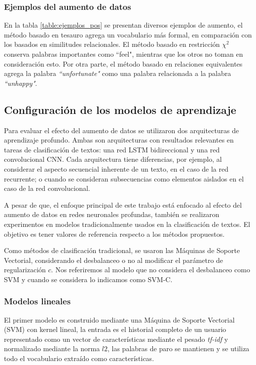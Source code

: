 

\subsubsection{Ejemplos del aumento de datos}
En la tabla \ref{table:ejemplos_pos} se presentan diversos ejemplos de aumento, el método basado en tesauro agrega un vocabulario más formal, en comparación con los basados en similitudes relacionales. El método basado en restricción $\chi^2$ conserva palabras importantes como ``feel", mientras que los otros no toman en consideración esto. Por otra parte, el método basado en relaciones equivalentes agrega la palabra \textit{``unfortunate"} como una palabra relacionada a la palabra \textit{``unhappy"}. 




 
\subsection{Configuración de los modelos de aprendizaje}

Para evaluar el efecto del aumento de datos se utilizaron dos arquitecturas de aprendizaje profundo. Ambas son arquitecturas con resultados relevantes en tareas de clasificación de textos: una red LSTM bidireccional y una red convolucional CNN. Cada arquitectura tiene diferencias, por ejemplo, al considerar el aspecto secuencial inherente de un texto, en el caso de la red recurrente; o cuando se consideran subsecuencias como elementos aislados en el caso de la red convolucional.

A pesar de que, el enfoque principal de este trabajo está enfocado al efecto del aumento de datos en redes neuronales profundas, también se realizaron experimentos en modelos tradicionalmente usados en la clasificación de textos. El objetivo es tener valores de referencia respecto a los métodos propuestos. 

Como métodos de clasificación tradicional, se usaron las Máquinas de Soporte Vectorial, considerando el desbalanceo o no al modificar el parámetro de regularización $c$. Nos referiremos al modelo que no considera el desbalanceo como SVM y cuando se considera lo indicamos como SVM-C. 


\subsubsection{Modelos lineales}
 El primer modelo es construido mediante una Máquina de Soporte Vectorial (SVM) con kernel lineal, la entrada es el historial completo de un usuario representado como un vector de características mediante el pesado \textit{tf-idf} y normalizado mediante la norma $l2$, las palabras de paro se mantienen y se utiliza todo el vocabulario extraído como características. 
 
